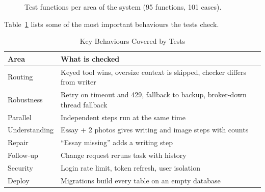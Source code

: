 \documentclass[conference]{IEEEtran}
\begin{document}
\begin{figure}[!t]
\centering
{}
\caption{Test functions per area of the system (95 functions, 101 cases).}
\label{fig:tests}
\end{figure}

Table~\ref{tab:testcov} lists some of the most important behaviours the tests check.

\begin{table}[htbp]
\caption{Key Behaviours Covered by Tests}
\begin{center}
\footnotesize
\begin{tabular}{@{}lp{4.6cm}@{}}
\toprule
\textbf{Area} & \textbf{What is checked} \\
\midrule
Routing & Keyed tool wins, oversize context is skipped, checker differs from writer \\
Robustness & Retry on timeout and 429, fallback to backup, broker-down thread fallback \\
Parallel & Independent steps run at the same time \\
Understanding & Essay + 2 photos gives writing and image steps with counts \\
Repair & ``Essay missing'' adds a writing step \\
Follow-up & Change request reruns task with history \\
Security & Login rate limit, token refresh, user isolation \\
Deploy & Migrations build every table on an empty database \\
\bottomrule
\end{tabular}
\label{tab:testcov}
\end{center}
\end{table}
\end{document}
